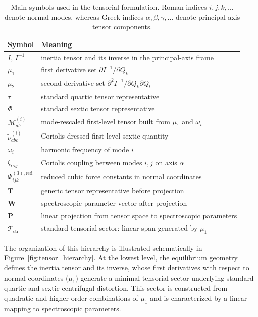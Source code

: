 \documentclass[aip,jcp,reprint,floatfix]{revtex4-2}
\begin{document}
\begin{table}[t]
\centering
\caption{Main symbols used in the tensorial formulation. Roman indices
$i,j,k,\ldots$ denote normal modes, whereas Greek indices
$\alpha,\beta,\gamma,\ldots$ denote principal-axis tensor components.}
\begin{tabular}{ll}
\hline
Symbol & Meaning \\
\hline
$I$, $I^{-1}$ & inertia tensor and its inverse in the principal-axis frame \\
$\mu_1$ & first derivative set $\partial I^{-1}/\partial Q_k$ \\
$\mu_2$ & second derivative set $\partial^2 I^{-1}/\partial Q_k \partial Q_l$ \\
$\tau$ & standard quartic tensor representative \\
$\Phi$ & standard sextic tensor representative \\
$\mathcal{M}^{(i)}_{ab}$ & mode-rescaled first-level tensor built from $\mu_1$ and $\omega_i$ \\
$\widetilde{\nu}^{(i)}_{abc}$ & Coriolis-dressed first-level sextic quantity \\
$\omega_i$ & harmonic frequency of mode $i$ \\
$\zeta_{\alpha ij}$ & Coriolis coupling between modes $i,j$ on axis $\alpha$ \\
$\Phi^{(3),\mathrm{red}}_{ijk}$ & reduced cubic force constants in normal coordinates \\
$\mathbf T$ & generic tensor representative before projection \\
$\mathbf W$ & spectroscopic parameter vector after projection \\
$\mathbf P$ & linear projection from tensor space to spectroscopic parameters \\
$\mathcal{T}_{\mathrm{std}}$ & standard tensorial sector: linear span generated by $\mu_1$ \\
\hline
\end{tabular}
\label{tab:notation_summary}
\end{table}

The organization of this hierarchy is illustrated schematically in
Figure~\ref{fig:tensor_hierarchy}. At the lowest level, the equilibrium
geometry defines the inertia tensor and its inverse, whose first 
derivatives with respect to normal coordinates ($\mu_1$) generate
a minimal tensorial sector underlying standard quartic and sextic
centrifugal distortion. This sector is constructed from quadratic and
higher-order combinations of $\mu_1$ and is characterized by a linear
mapping to spectroscopic parameters.
\end{document}
